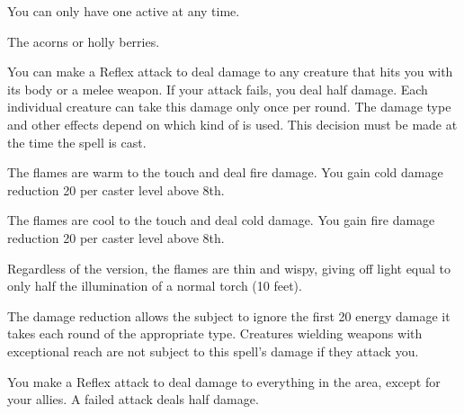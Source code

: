\begin{spellnotes}
  You can only have one  active at any time.
\end{spellnotes}
\par {} The acorns or holly berries.

\spellrng{\rngpers}
\begin{spelleffect}
  You can make a Reflex attack to deal damage to any creature that hits you with its body or a melee weapon. If your attack fails, you deal half damage. Each individual creature can take this damage only once per round. The damage type and other effects depend on which kind of  is used. This decision must be made at the time the spell is cast.

  \par {} The flames are warm to the touch and deal fire damage. You gain cold damage reduction 20  per caster level above 8th.
  \par {} The flames are cool to the touch and deal cold damage. You gain fire damage reduction 20  per caster level above 8th.

  Regardless of the version, the flames are thin and wispy, giving off light equal to only half the illumination of a normal torch (10 feet).
\end{spelleffect}
\begin{spellnotes}
  The damage reduction allows the subject to ignore the first 20 energy damage it takes each round of the appropriate type. Creatures wielding weapons with exceptional reach are not subject to this spell's damage if they attack you.
\end{spellnotes}

\spellrng{\rngmed}
\begin{spelleffect}
    You make a Reflex attack to deal damage to everything in the area, except for your allies. A failed attack deals half damage.
\end{spelleffect}


